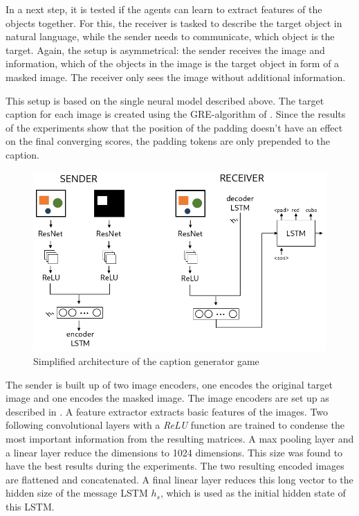 In a next step, it is tested if the agents can learn to extract features of the objects together.
For this, the receiver is tasked to describe the target object in natural language, while the sender needs to communicate, which object is the target.
Again, the setup is asymmetrical: the sender receives the image and information, which of the objects in the image is the target object in form of a masked image.
The receiver only sees the image without additional information.

This setup is based on the single neural model described above.
The target caption for each image is created using the GRE-algorithm of \citet{Dale1995}.
Since the results of the experiments show that the position of the padding doesn't have an effect on the final converging scores, the padding tokens are only prepended to the caption.

\begin{figure}[h]
    \centering
    \includegraphics[width=.7\linewidth]{figures/arch_caption_generator_game.png}
    \caption{Simplified architecture of the caption generator game}
    \label{fig:caption_generator_game_architecture}
\end{figure}

The sender is built up of two image encoders, one encodes the original target image and one encodes the masked image.
The image encoders are set up as described in \citep{Johnson2017}.
A feature extractor extracts basic features of the images.
Two following convolutional layers with a \emph{ReLU} function are trained to condense the most important information from the resulting matrices.
A max pooling layer and a linear layer reduce the dimensions to 1024 dimensions.
This size was found to have the best results during the experiments.
The two resulting encoded images are flattened and concatenated.
A final linear layer reduces this long vector to the hidden size of the message LSTM $h_s$, which is used as the initial hidden state of this LSTM.

